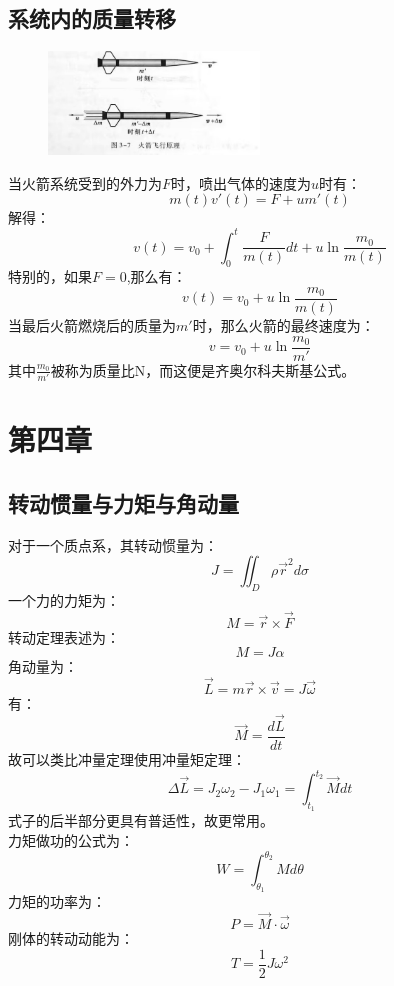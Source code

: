 \documentclass{ctexart}
\begin{document}
\subsection{系统内的质量转移}
\begin{figure}[H]
    \centering
    \includegraphics[width=0.5\textwidth]{img/3-7.jpg}
\end{figure}
当火箭系统受到的外力为$F$时，喷出气体的速度为$u$时有：
$$
    m(t) v'(t) = F + u m'(t)
$$
解得：
$$
    v(t) = v_0 + \int_0^t \frac{F}{m(t)}dt + u \ln \frac{m_0}{m(t)}
$$
特别的，如果$F = 0$,那么有：
$$
    v(t) = v_0 + u \ln \frac{m_0}{m(t)}
$$
当最后火箭燃烧后的质量为$m'$时，那么火箭的最终速度为：
$$
    v = v_0 + u \ln \frac{m_0}{m'}
$$
其中$\frac{m_0}{m'}$被称为质量比N，而这便是齐奥尔科夫斯基公式。
\section{第四章}
\subsection{转动惯量与力矩与角动量}
对于一个质点系，其转动惯量为：
$$
    J = \iint_{D} \rho \vec{r}^2 d \sigma
$$
一个力的力矩为：
$$
    M = \vec{r} \times \vec{F}
$$
转动定理表述为：
$$
    M = J \alpha
$$
角动量为：
$$
    \vec{L} = m \vec{r} \times \vec{v} = J \vec{\omega}
$$
有：
$$
    \vec{M} = \frac{d\vec{L}}{dt}
$$
故可以类比冲量定理使用冲量矩定理：
$$
    \Delta \vec{L} =J_2\omega_2 - J_1\omega_1 = \int_{t_1}^{t_2} \vec{M} dt
$$
式子的后半部分更具有普适性，故更常用。\\
力矩做功的公式为：
$$
    W = \int_{\theta_1}^{\theta_2} M d\theta
$$
力矩的功率为：
$$
    P = \vec{M} \cdot \vec{\omega}
$$
刚体的转动动能为：
$$
    T = \frac{1}{2} J \omega^2
$$
\end{document}
